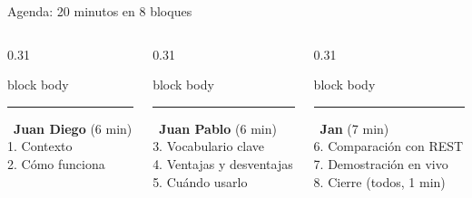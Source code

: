\documentclass[aspectratio=169,11pt]{beamer}
\newcommand{\bloqueactual}{0}
\newcommand{\quienhabla}{}
\newcommand{\seccion}[2]{\gdef\bloqueactual{#1}\gdef\quienhabla{#2}}
\begin{document}
\seccion{0}{Todos}
\begin{frame}{Agenda: 20 minutos en 8 bloques}
  \centering

  \vspace{0.5cm}
  \begin{columns}[T]
    \begin{column}{0.31\textwidth}
      \begin{beamercolorbox}[sep=5pt,rounded=true]{block body}
        \textcolor{cJD}{\rule{8pt}{8pt}}\ \textbf{Juan Diego} {\color{gris}\scriptsize(6 min)}\\[3pt]
        \small 1. Contexto\\ 2. Cómo funciona
      \end{beamercolorbox}
    \end{column}
    \begin{column}{0.31\textwidth}
      \begin{beamercolorbox}[sep=5pt,rounded=true]{block body}
        \textcolor{cJP}{\rule{8pt}{8pt}}\ \textbf{Juan Pablo} {\color{gris}\scriptsize(6 min)}\\[3pt]
        \small 3. Vocabulario clave\\ 4. Ventajas y desventajas\\ 5. Cuándo usarlo
      \end{beamercolorbox}
    \end{column}
    \begin{column}{0.31\textwidth}
      \begin{beamercolorbox}[sep=5pt,rounded=true]{block body}
        \textcolor{cJan}{\rule{8pt}{8pt}}\ \textbf{Jan} {\color{gris}\scriptsize(7 min)}\\[3pt]
        \small 6. Comparación con REST\\ 7. Demostración en vivo\\ {\color{gris}8. Cierre (todos, 1 min)}
      \end{beamercolorbox}
    \end{column}
  \end{columns}
\end{frame}
\end{document}
